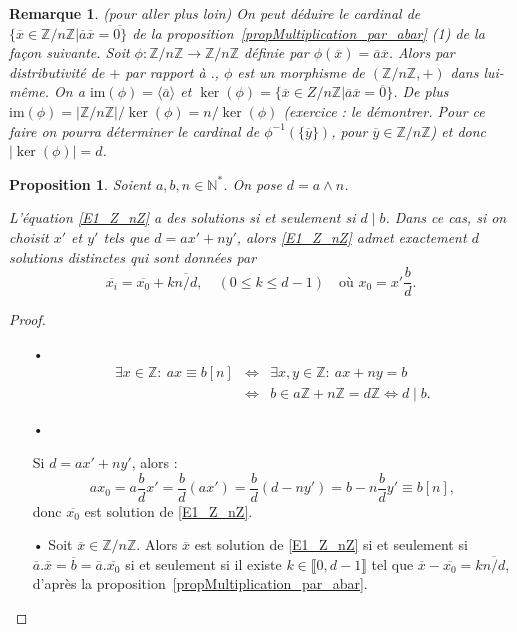 \documentclass[12pt]{report}
\newtheorem*{rem}{Remarque}
\newtheorem{Prop}[thm]{Proposition}
\newcommand{\Z}{\mathbb{Z}}
\begin{document}
\begin{rem}(pour aller plus loin) On peut déduire le cardinal de $\{\overline{x}\in \Z/n\Z|\overline{a}\overline{x}=\overline{0\}}$ de la proposition~\ref{propMultiplication_par_abar}  (1) de la façon suivante. Soit $\phi:\Z/n\Z\rightarrow \Z/n\Z$ définie par  $\phi(\overline{x})=\overline{a}\overline{x}$. Alors par distributivité de $+$ par rapport à $.$, $\phi$ est un morphisme de $(\Z/n\Z,+)$ dans lui-même. On a $\mathrm{im}(\phi)=\langle \overline{a}\rangle$ et $\ker(\phi)=\{\overline{x}\in Z/n\Z|\overline{a}\overline{x}=\overline{0}\}$. De plus $\mathrm{im}(\phi)=|\Z/n\Z|/\ker(\phi)=n/\ker(\phi)$ (exercice : le démontrer.  Pour ce faire on pourra déterminer le cardinal de $\phi^{-1}(\{\overline{y}\})$, pour $\overline{y}\in \Z/n\Z$) et donc $|\ker(\phi)|=d$.

\end{rem}

\begin{Prop}
Soient $a,b,n \in \mathbb{N}^*$. On pose $d=a\wedge n$. \par 
L'équation \eqref{E1_Z_nZ} a des solutions si et seulement si $d \mid b$. Dans ce cas, si on choisit $x'$ et $y'$ tels que $d=ax'+ny'$, alors \eqref{E1_Z_nZ} admet exactement $d$ solutions distinctes qui sont données par 
$$ \overline{x_i}=\overline{x_0} +k\overline{n/d}, \quad (0 \leq k \leq d-1) \quad \text{où  } x_0=x'\frac{b}{d}.      $$
\end{Prop}

\begin{proof}\
\begin{itemize}
\item[•]
\begin{eqnarray*}
\exists x \in \mathbb{Z}:\ ax \equiv b [n] & \Longleftrightarrow & \exists x,y \in \mathbb{Z}: \ ax+ny=b \\
  & \Longleftrightarrow & b \in a \mathbb{Z}+n \mathbb{Z}=d \mathbb{Z} \Longleftrightarrow d \mid b.
\end{eqnarray*}
\item[•] \par 
Si $d=ax'+ny'$, alors  :  \[a x_0=a\frac{b}{d} x'=\frac{b}{d}(ax')=\frac{b}{d}(d-ny')=b-n\frac{b}{d}y'\equiv b[n],\] donc $\overline{x_0}$ est solution de \eqref{E1_Z_nZ}.

\item[•] Soit $\overline{x}\in \Z/n\Z$. Alors $\overline{x}$ est solution de \eqref{E1_Z_nZ} si et seulement si $\overline{a}.\overline{x}=\overline{b}=\overline{a}.\overline{x_0}$ si et seulement si il existe $k\in \llbracket 0,d-1\rrbracket$ tel que $\overline{x}-\overline{x_0}=k\overline{n/d}$,  d'après  la proposition~\ref{propMultiplication_par_abar}.
\end{itemize}
\end{proof}
\end{document}
